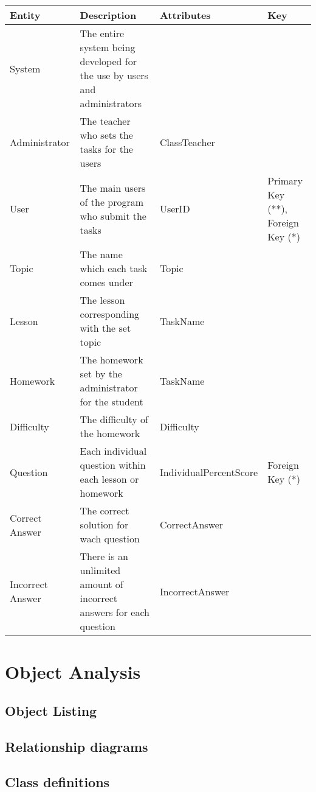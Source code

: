 \begin{center}
\begin{tabular}{|p{3cm}|p{4cm}|p{4cm}|p{3cm}|} \hline
\textbf{Entity} & \textbf{Description} & \textbf{Attributes} & \textbf{Key} \\ \hline
System & The entire system being developed for the use by users and administrators &  & \\ \hline
Administrator  & The teacher who sets the tasks for the users & ClassTeacher &  \\ \hline
User & The main users of the program who submit the tasks & UserID & Primary Key (**), Foreign Key (*) \\ \hline
Topic & The name which each task comes under & Topic &  \\ \hline
Lesson & The lesson corresponding with the set topic & TaskName & \\ \hline
Homework & The homework set by the administrator for the student & TaskName & \\ \hline
Difficulty & The difficulty of the homework & Difficulty & \\ \hline
Question & Each individual question within each lesson or homework & IndividualPercentScore & Foreign Key (*) \\ \hline
Correct Answer & The correct solution for wach question & CorrectAnswer & \\ \hline
Incorrect Answer & There is an unlimited amount of incorrect answers for each question & IncorrectAnswer & \\ \hline
\end{tabular}
\end{center}

\section{Object Analysis}

\subsection{Object Listing}

\subsection{Relationship diagrams}

\subsection{Class definitions}

